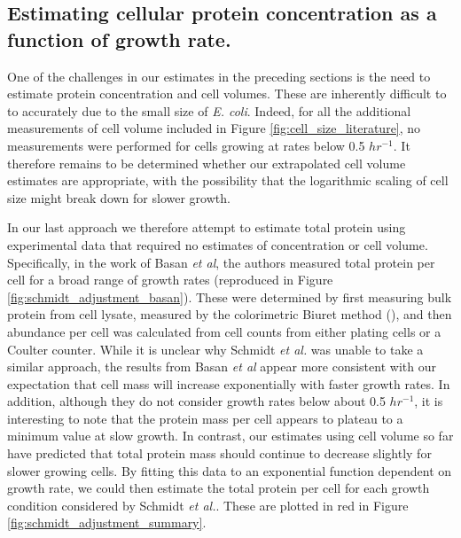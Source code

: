 \subsection{Estimating cellular protein concentration as a function of growth rate.}

One of the challenges in our estimates in the preceding  sections is the need to estimate protein
concentration and cell volumes. These are inherently difficult to to accurately due to the small size of \textit{E. coli}. Indeed, for
all the additional measurements of cell volume included in Figure \ref{fig:cell_size_literature},
no measurements were performed for cells growing at rates below 0.5 $hr^{-1}$. It therefore remains
to be determined whether our extrapolated cell volume estimates are appropriate, with the
possibility that the logarithmic scaling of cell size might break down for slower growth.

In our last approach we therefore attempt to estimate total protein
using experimental data that required  no estimates of concentration or cell
volume. Specifically, in the work of  Basan \textit{et al}, the authors measured total protein
per cell for a broad range of growth rates (reproduced in Figure \ref{fig:schmidt_adjustment_basan}).
These were determined
by first measuring bulk protein from cell lysate, measured by the colorimetric Biuret method (\cite{You2013}), and then abundance per cell was calculated from cell counts from either plating cells or a Coulter counter. While it is
unclear why Schmidt \textit{et al.} was unable to take a similar approach, the
results from Basan \textit{et al} appear more consistent with our expectation that cell mass will  increase
exponentially with faster growth rates. In addition, although they do not consider growth rates below
about 0.5 $hr^{-1}$, it is interesting to note that the protein mass per cell appears to plateau to a minimum value at slow growth. In contrast, our estimates using cell volume so far have predicted that total protein mass should continue to decrease slightly for slower growing cells.
By fitting this data to an exponential function dependent on growth rate, we could then estimate the
total protein per cell for each growth condition considered by Schmidt \textit{et al.}.
These are plotted in red in Figure \ref{fig:schmidt_adjustment_summary}.


